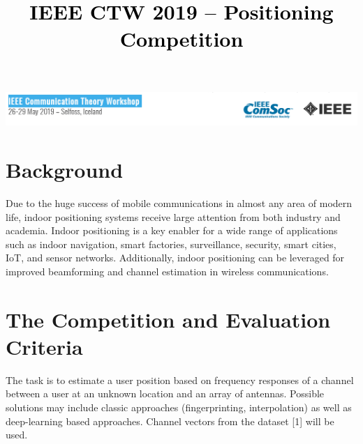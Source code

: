 \documentclass[letter]{moderncv} %
\title{\textbf{\textcolor{black}{IEEE CTW 2019 -- Positioning Competition}}} %
\begin{document}
\includegraphics[width=1\textwidth]{Comsoc}
\maketitle %
\vspace{-4ex}
\section{Background}
Due to the huge success of mobile communications in almost any area of modern life, indoor positioning systems   receive large attention from both industry and academia. 
Indoor positioning  is  a key enabler for a wide range of applications such as indoor navigation, smart factories, surveillance, security, smart cities, IoT, and sensor networks. 
Additionally, indoor positioning  can be leveraged for improved beamforming and  channel estimation in wireless communications. 






\section{The Competition and Evaluation Criteria}

The task is to estimate a user position based on frequency responses of a channel between a user at an unknown location and an array of antennas. 
Possible solutions may include classic approaches (fingerprinting, interpolation) as well as deep-learning based approaches. 
Channel vectors from  the dataset [1] will be used.
\end{document}
